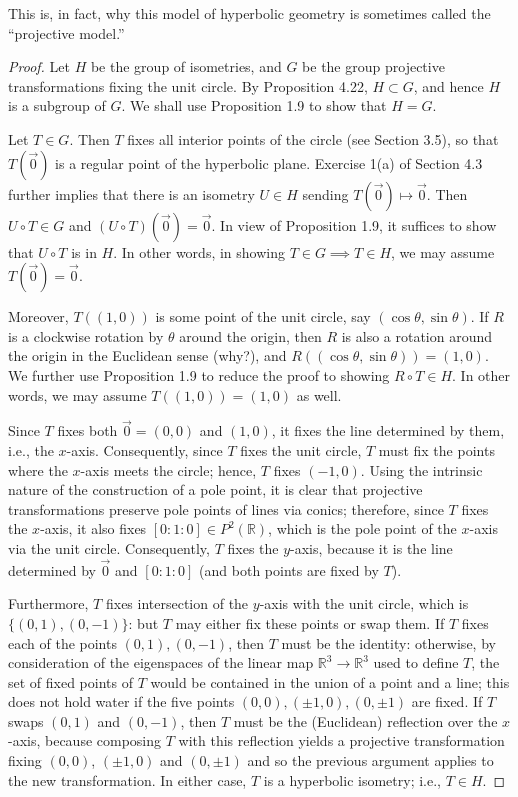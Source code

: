 \documentclass[leqno]{book}
\begin{document}
\noindent This is, in fact, why this model of hyperbolic geometry is sometimes called the ``projective model.''
\begin{proof}
Let $H$ be the group of isometries, and $G$ be the group projective transformations fixing the unit circle.  By Proposition 4.22, $H\subset G$, and hence $H$ is a subgroup of $G$.  We shall use Proposition 1.9 to show that $H=G$.

Let $T\in G$.  Then $T$ fixes all interior points of the circle (see Section 3.5), so that $T(\vec 0)$ is a regular point of the hyperbolic plane.  Exercise 1(a) of Section 4.3 further implies that there is an isometry $U\in H$ sending $T(\vec 0)\mapsto\vec 0$.  Then $U\circ T\in G$ and $(U\circ T)(\vec 0)=\vec 0$.  In view of Proposition 1.9, it suffices to show that $U\circ T$ is in $H$.  In other words, in showing $T\in G\implies T\in H$, we may assume $T(\vec 0)=\vec 0$.

Moreover, $T((1,0))$ is some point of the unit circle, say $(\cos\theta,\sin\theta)$.  If $R$ is a clockwise rotation by $\theta$ around the origin, then $R$ is also a rotation around the origin in the Euclidean sense (why?), and $R((\cos\theta,\sin\theta))=(1,0)$.  We further use Proposition 1.9 to reduce the proof to showing $R\circ T\in H$.  In other words, we may assume $T((1,0))=(1,0)$ as well.

Since $T$ fixes both $\vec 0=(0,0)$ and $(1,0)$, it fixes the line determined by them, i.e., the $x$-axis.  Consequently, since $T$ fixes the unit circle, $T$ must fix the points where the $x$-axis meets the circle; hence, $T$ fixes $(-1,0)$.  Using the intrinsic nature of the construction of a pole point, it is clear that projective transformations preserve pole points of lines via conics; therefore, since $T$ fixes the $x$-axis, it also fixes $[0:1:0]\in P^2(\mathbb R)$, which is the pole point of the $x$-axis via the unit circle.  Consequently, $T$ fixes the $y$-axis, because it is the line determined by $\vec 0$ and $[0:1:0]$ (and both points are fixed by $T$).

Furthermore, $T$ fixes intersection of the $y$-axis with the unit circle, which is $\{(0,1),(0,-1)\}$: but $T$ may either fix these points or swap them.  If $T$ fixes each of the points $(0,1),(0,-1)$, then $T$ must be the identity: otherwise, by consideration of the eigenspaces of the linear map $\mathbb R^3\to\mathbb R^3$ used to define $T$, the set of fixed points of $T$ would be contained in the union of a point and a line; this does not hold water if the five points $(0,0),(\pm 1,0),(0,\pm 1)$ are fixed.  If $T$ swaps $(0,1)$ and $(0,-1)$, then $T$ must be the (Euclidean) reflection over the $x$-axis, because composing $T$ with this reflection yields a projective transformation fixing $(0,0)$, $(\pm 1,0)$ and $(0,\pm 1)$ and so the previous argument applies to the new transformation.  In either case, $T$ is a hyperbolic isometry; i.e., $T\in H$.
\end{proof}
\end{document}
